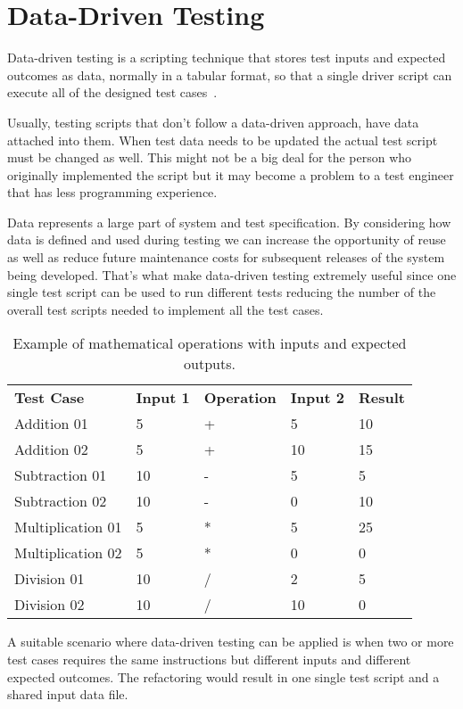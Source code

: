 \section{Data-Driven Testing}

Data-driven testing is a scripting technique that stores test inputs and
expected outcomes as data, normally in a tabular format, so that a single
driver script can execute all of the designed test cases~\cite{Fewster99}.

Usually, testing scripts that don't follow a data-driven approach, have data
attached into them. When test data needs to be updated the actual test script
must be changed as well. This might not be a big deal for the person who
originally implemented the script but it may become a problem to a test engineer
that has less programming experience.

Data represents a large part of system and test specification. By considering
how data is defined and used during testing we can increase the opportunity
of reuse as well as reduce future maintenance costs for subsequent releases of
the system being developed. That's what make data-driven testing extremely
useful since one single test script can be used to run different tests reducing
the number of the overall test scripts needed to implement all the test cases.

\begin{table}[!ht]
\centering
\begin{tabular}{lllll}
\textbf{Test Case} & \textbf{Input 1} & \textbf{Operation} & \textbf{Input 2} & \textbf{Result} \\
Addition 01 & 5 & + & 5 & 10 \\
Addition 02 & 5 & + & 10 & 15 \\
Subtraction 01 & 10 & - & 5 & 5 \\
Subtraction 02 & 10 & - & 0 & 10 \\
Multiplication 01 & 5 & * & 5 & 25 \\
Multiplication 02 & 5 & * & 0 & 0 \\
Division 01 & 10 & / & 2 & 5 \\
Division 02 & 10 & / & 10 & 0 \\
\end{tabular}
\caption{Example of mathematical operations with inputs and expected outputs.}
\label{table:tab1}
\end{table}

A suitable scenario where data-driven testing can be applied is when two or more
test cases requires the same instructions but different inputs and different
expected outcomes. The refactoring would result in one single test script and a
shared input data file.


